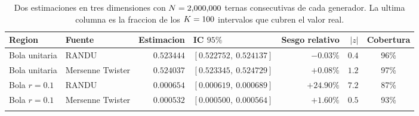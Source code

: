 \begin{table}[htbp]\centering
\caption{Dos estimaciones en tres dimensiones con $N=2{,}000{,}000$ ternas consecutivas de cada generador. La ultima columna es la fraccion de los $K=100$ intervalos que cubren el valor real.}
\label{tab:randu}
\small
\begin{tabular}{l|l|r|l|r|r|c}
\toprule
Region & Fuente & Estimacion & IC $95\%$ & Sesgo relativo & $|z|$ & Cobertura \\
\midrule
Bola unitaria & RANDU & $0.523444$ & $[0.522752,\ 0.524137]$ & $-0.03\%$ & $0.4$ & 96\% \\
Bola unitaria & Mersenne Twister & $0.524037$ & $[0.523345,\ 0.524729]$ & $+0.08\%$ & $1.2$ & 97\% \\
\addlinespace
Bola $r=0.1$ & RANDU & $0.000654$ & $[0.000619,\ 0.000689]$ & $+24.90\%$ & $7.2$ & 87\% \\
Bola $r=0.1$ & Mersenne Twister & $0.000532$ & $[0.000500,\ 0.000564]$ & $+1.60\%$ & $0.5$ & 93\% \\
\addlinespace
\bottomrule
\end{tabular}
\end{table}
